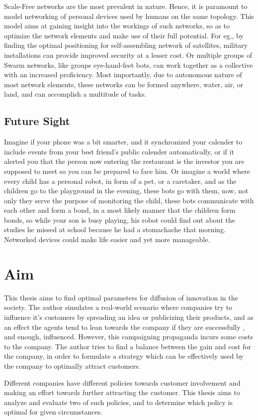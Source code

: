 Scale-Free networks are the most prevalent in nature. Hence, it is paramount to model networking of personal devices used by humans on the same topology. 
This model aims at gaining insight into the workings of such networks, so as to optimize the network elements and make use of their full potential. For eg., by finding the optimal positioning for self-assembling network of satellites, military installations can provide improved security at a lesser cost. Or multiple groups of Swarm networks, like groups eye-hand-feet bots, can work together as a collective with an increased proficiency.  Most importantly, due to autonomous nature of most network elements, these networks can be formed anywhere, water, air, or land, and can accomplish a multitude of tasks.

\subsection{Future Sight}

Imagine if your phone was a bit smarter, and it synchronized your calender to include events from your best friend's public calender automatically, or if it alerted you that the person now entering the restaurant is the investor you are supposed to meet so you can be prepared to face him. Or imagine a world where every child has a personal robot, in form of a pet, or a caretaker, and as the children go to the playground in the evening, these bots go with them, now, not only they serve the purpose of monitoring the child, these bots communicate with each other and form a bond, in a most likely manner that the children form bonds, so while your son is busy playing, his robot could find out about the studies he missed at school because he had a stomachache that morning.
Networked devices could make life easier and yet more manageable.


\section{Aim}
This thesis aims to find optimal parameters for diffusion of innovation in the society. 
The author simulates a real-world scenario where companies try to influence it's customers by spreading an idea or publicizing their products, and as an effect the agents tend to lean towards the company if they are successfully , and enough, influenced.
However, this campaigning propaganda incurs some costs to the company. The author tries to find a balance between the gain and cost for the company, in order to formulate a strategy which can be effectively used by the company to optimally attract customers. 

Different companies have different policies towards customer involvement and making an effort towards further attracting the customer. This thesis aims to analyze and evaluate two of such policies, and to determine which policy is optimal for given circumstances.
